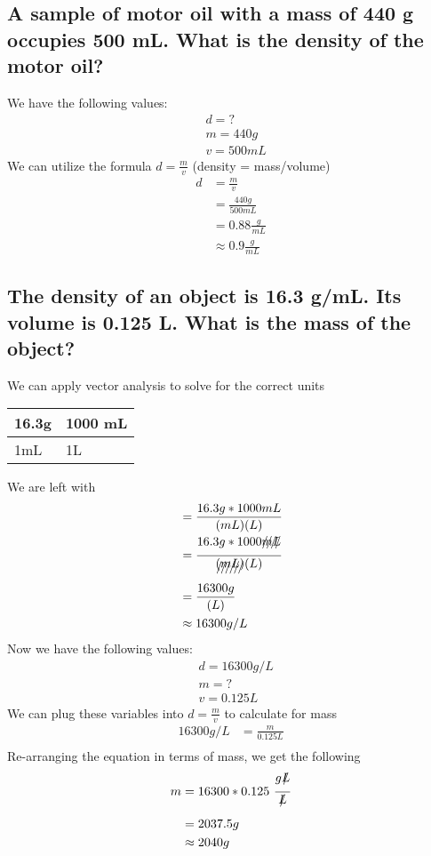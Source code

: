 \documentclass[11pt]{article}
\begin{document}
\subsection{A sample of motor oil with a mass of 440 g occupies 500 mL. What is the density of the motor oil?}
\label{sec:orgc1c5c95}
We have the following values:
\begin{align*}
&d = ?\\
&m = 440g\\
&v = 500mL
\end{align*}
We can utilize the formula \(d=\frac{m}{v}\) (density = mass/volume)
\begin{align*}
d&=\frac{m}{v}\\
&=\frac{440g}{500mL}\\
&=0.88\frac{g}{mL}\\
&\approx0.9\frac{g}{mL}
\end{align*}

\subsection{The density of an object is 16.3 g/mL. Its volume is 0.125 L. What is the mass of the object?}
\label{sec:org0725c3d}
We can apply vector analysis to solve for the correct units
\begin{center}
\begin{tabular}{ll}
16.3g & 1000 mL\\
\hline
1mL & 1L\\
\end{tabular}
\end{center}
We are left with
\begin{align*}
&= \frac{16.3g * 1000mL}{(mL)(L)}\\
&= \frac{16.3g * 1000\xout{mL}}{\xout{(mL)}(L)}\\
&= \frac{16300g}{(L)}\\
&\approx 16300g/L
\end{align*}
Now we have the following values:
\begin{align*}
&d = 16300g/L\\
&m = ?\\
&v = 0.125L
\end{align*}
We can plug these variables into \(d=\frac{m}{v}\) to calculate for mass
\begin{align*}
16300{g}/{L} &=\frac{m}{0.125L}\\
\end{align*}
Re-arranging the equation in terms of mass, we get the following
\begin{align*}
m &= 16300 * 0.125\ \frac{g\xout{L}}{\xout{L}}\\
&= 2037.5g\\
&\approx 2040g
\end{align*}
\end{document}
